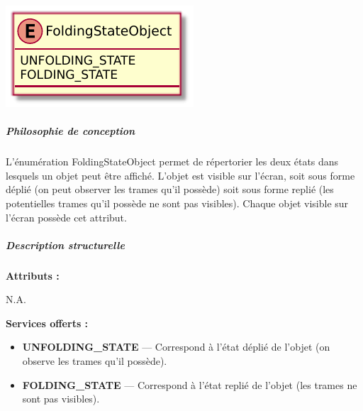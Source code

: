 \begin{minipage}
    {\linewidth}
    \centering
    \includegraphics[width=0.40\linewidth]{../schemas/Conception_detaillee/classe_foldingStateObject.pdf}
\end{minipage}

\subparagraph{Philosophie de conception \newline} 

\medspace

L'énumération FoldingStateObject permet de répertorier les deux états dans lesquels un objet peut être affiché. L'objet est visible sur l'écran, soit sous forme déplié (on peut observer les trames qu'il possède) soit sous forme replié (les potentielles trames qu'il possède ne sont pas visibles). Chaque objet visible sur l'écran possède cet attribut.

\subparagraph{Description structurelle \newline}

\medspace

\textbf{Attributs :}

N.A.

\textbf{Services offerts :}

\begin{itemize}
    \item \textbf{UNFOLDING\_STATE} --- Correspond à l'état déplié de l'objet (on observe les trames qu'il possède).
    \item \textbf{FOLDING\_STATE} --- Correspond à l'état replié de l'objet (les trames ne sont pas visibles).
\end{itemize}




